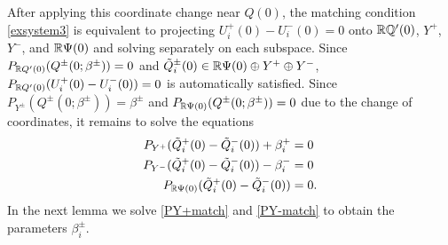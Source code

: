\documentclass[12pt]{elsarticle}
\theoremstyle{plain}
\theoremstyle{definition}
\theoremstyle{remark}
\numberwithin{theorem}{section}
\numberwithin{equation}{section}
\begin{document}
After applying this coordinate change near $Q(0)$, the matching condition \cref{exsystem3} is equivalent to projecting $U_i^+(0) - U_i^-(0) = 0$ onto $\mathbb{R} \mathbb{Q}'(0)$, $Y^+$, $Y^-$, and $\mathbb{R} \Psi(0)$ and solving separately on each subspace. Since $P_{\mathbb{R} Q'(0)}(Q^\pm(0; \beta^\pm)) = 0$ and $\tilde{Q}_i^\pm(0) \in \mathbb{R} \Psi(0) \oplus Y^+ \oplus Y^-$, $P_{\mathbb{R} Q'(0)}(U_i^+(0) - U_i^-(0)) = 0$ is automatically satisfied. Since $P_{Y^\pm}(Q^\pm(0; \beta^\pm)) = \beta^\pm$ and $P_{\mathbb{R} \Psi(0)}(Q^\pm(0; \beta^\pm)) = 0$ due to the change of coordinates, it remains to solve the equations
\begin{align}
P_{Y^+}(\tilde{Q}_i^+(0) - \tilde{Q}_i^-(0)) + \beta_i^+  &= 0 \label{PY+match} \\
P_{Y^-}(\tilde{Q}_i^+(0) - \tilde{Q}_i^-(0)) - \beta_i^- &= 0 \label{PY-match} \\
P_{\mathbb{R} \Psi(0)}(\tilde{Q}_i^+(0) - \tilde{Q}_i^-(0)) &= 0. \label{PZmatch}
\end{align}
In the next lemma we solve \cref{PY+match} and \cref{PY-match} to obtain the parameters $\beta_i^\pm$.
\end{document}
